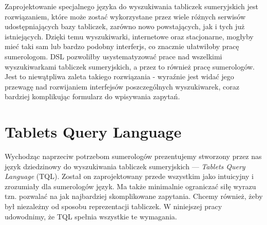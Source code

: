 Zaprojektowanie specjalnego języka do wyszukiwania tabliczek sumeryjskich jest rozwiązaniem, które może zostać wykorzystane przez wiele różnych serwisów udostępniających bazy tabliczek, zarówno nowo powstających, jak i tych już istniejących. Dzięki temu wyszukiwarki, internetowe oraz stacjonarne, mogłyby mieć taki sam lub bardzo podobny interferjs, co znacznie ułatwiłoby pracę sumerologom. DSL pozwoliłby usystematyzować prace nad wszelkimi wyszukiwarkami tabliczek sumeryjskich, a przez to również pracę sumerologów. Jest to niewątpliwa zaleta takiego rozwiązania - wyraźnie jest widać jego przewagę nad rozwijaniem interfejsów poszczególnych wyszukiwarek, coraz bardziej komplikując formularz do wpisywania zapytań.



\section*{Tablets Query Language}

Wychodząc naprzeciw potrzebom sumerologów prezentujemy stworzony przez nas język dziedzinowy do wyszukiwania tabliczek sumeryjskich --- \textit{Tablets Query Language} (TQL). Został on zaprojektowany przede wszystkim jako intuicyjny i zrozumiały dla sumerologów język. Ma także minimalnie ograniczać siłę wyrazu tzn. pozwalać na jak najbardziej skomplikowane zapytania. Chcemy również, żeby był niezależny od sposobu reprezentacji tabliczek. W niniejszej pracy udowodnimy, że TQL spełnia wszystkie te wymagania. 

